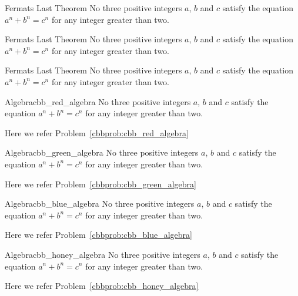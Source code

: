 \documentclass[11pt, letterpaper]{../exercise}
\begin{document}
    \begin{cbbhoney}{Fermats Last Theorem}
    No three positive integers \(a\), \(b\) and \(c\) satisfy the equation
    \(a^{n} + b^{n} = c^{n}\) for any integer greater than two.
    \end{cbbhoney}

    \begin{cbbpink}{Fermats Last Theorem}
    No three positive integers \(a\), \(b\) and \(c\) satisfy the equation
    \(a^{n} + b^{n} = c^{n}\) for any integer greater than two.
    \end{cbbpink}

    \begin{cbbpurple}{Fermats Last Theorem}
    No three positive integers \(a\), \(b\) and \(c\) satisfy the equation
    \(a^{n} + b^{n} = c^{n}\) for any integer greater than two.
    \end{cbbpurple}

    \begin{cbbredproblem}{Algebra}{cbb_red_algebra}
    No three positive integers \(a\), \(b\) and \(c\) satisfy the equation
    \(a^{n} + b^{n} = c^{n}\) for any integer greater than two.
    \end{cbbredproblem}
    Here we refer Problem~\ref{cbbprob:cbb_red_algebra}%

    \begin{cbbgreenproblem}{Algebra}{cbb_green_algebra}
    No three positive integers \(a\), \(b\) and \(c\) satisfy the equation
    \(a^{n} + b^{n} = c^{n}\) for any integer greater than two.
    \end{cbbgreenproblem}
    Here we refer Problem~\ref{cbbprob:cbb_green_algebra}

    \begin{cbbblueproblem}{Algebra}{cbb_blue_algebra}
    No three positive integers \(a\), \(b\) and \(c\) satisfy the equation
    \(a^{n} + b^{n} = c^{n}\) for any integer greater than two.
    \end{cbbblueproblem}
    Here we refer Problem~\ref{cbbprob:cbb_blue_algebra}

    \begin{cbbhoneyproblem}{Algebra}{cbb_honey_algebra}
    No three positive integers \(a\), \(b\) and \(c\) satisfy the equation
    \(a^{n} + b^{n} = c^{n}\) for any integer greater than two.
    \end{cbbhoneyproblem}
    Here we refer Problem~\ref{cbbprob:cbb_honey_algebra}
\end{document}
